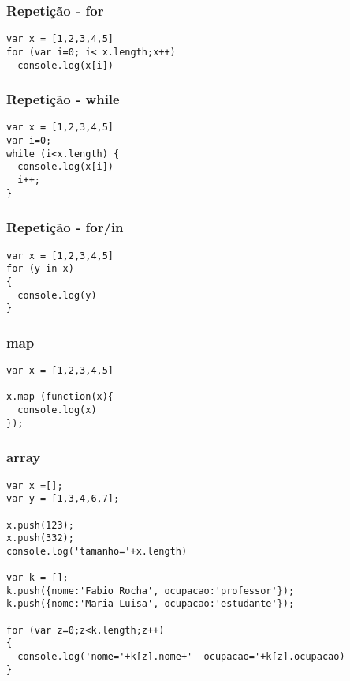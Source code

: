 \documentclass[14pt]{beamer}
\begin{document}
\begin{frame}[fragile]
 \frametitle{Repetição - for}
\begin{lstlisting}[basicstyle=\tiny\ttfamily]
var x = [1,2,3,4,5]
for (var i=0; i< x.length;x++)
  console.log(x[i])
\end{lstlisting}

\end{frame}

\begin{frame}[fragile]
 \frametitle{Repetição - while}
\begin{lstlisting}[basicstyle=\tiny\ttfamily]
var x = [1,2,3,4,5]
var i=0;
while (i<x.length) {
  console.log(x[i])
  i++;
}
\end{lstlisting}

\end{frame}

\begin{frame}[fragile]
 \frametitle{Repetição - for/in}
\begin{lstlisting}[basicstyle=\tiny\ttfamily]
var x = [1,2,3,4,5]
for (y in x)
{
  console.log(y)
}
\end{lstlisting}

\end{frame}

\begin{frame}[fragile]
 \frametitle{map}
\begin{lstlisting}[basicstyle=\tiny\ttfamily]
var x = [1,2,3,4,5]

x.map (function(x){
  console.log(x)
});
\end{lstlisting}

\end{frame}

\begin{frame}[fragile]
 \frametitle{array}
\begin{lstlisting}[basicstyle=\tiny\ttfamily]
var x =[];
var y = [1,3,4,6,7];

x.push(123);
x.push(332);
console.log('tamanho='+x.length)

var k = [];
k.push({nome:'Fabio Rocha', ocupacao:'professor'});
k.push({nome:'Maria Luisa', ocupacao:'estudante'});

for (var z=0;z<k.length;z++)
{
  console.log('nome='+k[z].nome+'  ocupacao='+k[z].ocupacao)
}



\end{lstlisting}

\end{frame}
\end{document}
